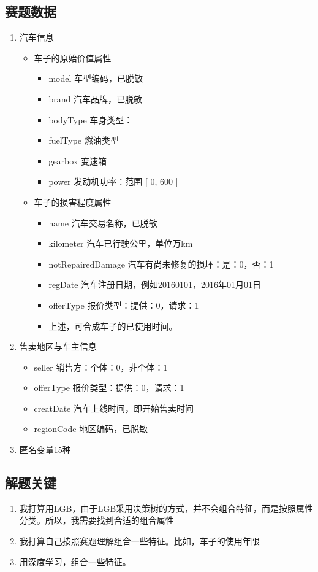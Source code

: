 \documentclass{article}
\begin{document}
	\subsection{赛题数据}
	\begin{enumerate}
		\item 汽车信息
		\begin{itemize}
			\item 车子的原始价值属性
			\begin{itemize}
				\item model	车型编码，已脱敏
				\item brand	汽车品牌，已脱敏
				\item bodyType	车身类型：
				\item fuelType	燃油类型
				\item gearbox	变速箱
				\item power	发动机功率：范围 [ 0, 600 ]
			\end{itemize}
			\item 车子的损害程度属性
			\begin{itemize}
				\item name	汽车交易名称，已脱敏
				\item kilometer	汽车已行驶公里，单位万km
				\item notRepairedDamage	汽车有尚未修复的损坏：是：0，否：1
				\item regDate	汽车注册日期，例如20160101，2016年01月01日
				\item offerType	报价类型：提供：0，请求：1
				\item 上述，可合成车子的已使用时间。
			\end{itemize}

		\end{itemize}
		\item 售卖地区与车主信息
		\begin{itemize}
			\item seller 销售方：个体：0，非个体：1
			\item offerType	报价类型：提供：0，请求：1
			\item creatDate	汽车上线时间，即开始售卖时间
			\item regionCode 地区编码，已脱敏
		\end{itemize}
		\item 匿名变量15种
	\end{enumerate}
	\subsection{解题关键}
	\begin{enumerate}
		\item 我打算用LGB，由于LGB采用决策树的方式，并不会组合特征，而是按照属性分类。所以，我需要找到合适的组合属性
		\item 我打算自己按照赛题理解组合一些特征。比如，车子的使用年限
		\item 用深度学习，组合一些特征。
	\end{enumerate}
\end{document}

